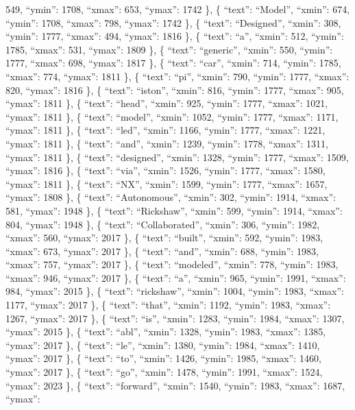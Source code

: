 \documentclass[
]{article}
\begin{document}
549, ``ymin'': 1708, ``xmax'': 653, ``ymax'': 1742 \}, \{ ``text'':
``Model'', ``xmin'': 674, ``ymin'': 1708, ``xmax'': 798, ``ymax'': 1742
\}, \{ ``text'': ``Designed'', ``xmin'': 308, ``ymin'': 1777, ``xmax'':
494, ``ymax'': 1816 \}, \{ ``text'': ``a'', ``xmin'': 512, ``ymin'':
1785, ``xmax'': 531, ``ymax'': 1809 \}, \{ ``text'': ``generic'',
``xmin'': 550, ``ymin'': 1777, ``xmax'': 698, ``ymax'': 1817 \}, \{
``text'': ``car'', ``xmin'': 714, ``ymin'': 1785, ``xmax'': 774,
``ymax'': 1811 \}, \{ ``text'': ``pi'', ``xmin'': 790, ``ymin'': 1777,
``xmax'': 820, ``ymax'': 1816 \}, \{ ``text'': ``iston'', ``xmin'': 816,
``ymin'': 1777, ``xmax'': 905, ``ymax'': 1811 \}, \{ ``text'': ``head'',
``xmin'': 925, ``ymin'': 1777, ``xmax'': 1021, ``ymax'': 1811 \}, \{
``text'': ``model'', ``xmin'': 1052, ``ymin'': 1777, ``xmax'': 1171,
``ymax'': 1811 \}, \{ ``text'': ``led'', ``xmin'': 1166, ``ymin'': 1777,
``xmax'': 1221, ``ymax'': 1811 \}, \{ ``text'': ``and'', ``xmin'': 1239,
``ymin'': 1778, ``xmax'': 1311, ``ymax'': 1811 \}, \{ ``text'':
``designed'', ``xmin'': 1328, ``ymin'': 1777, ``xmax'': 1509, ``ymax'':
1816 \}, \{ ``text'': ``via'', ``xmin'': 1526, ``ymin'': 1777, ``xmax'':
1580, ``ymax'': 1811 \}, \{ ``text'': ``NX'', ``xmin'': 1599, ``ymin'':
1777, ``xmax'': 1657, ``ymax'': 1808 \}, \{ ``text'': ``Autonomous'',
``xmin'': 302, ``ymin'': 1914, ``xmax'': 581, ``ymax'': 1948 \}, \{
``text'': ``Rickshaw'', ``xmin'': 599, ``ymin'': 1914, ``xmax'': 804,
``ymax'': 1948 \}, \{ ``text'': ``Collaborated'', ``xmin'': 306,
``ymin'': 1982, ``xmax'': 560, ``ymax'': 2017 \}, \{ ``text'':
``built'', ``xmin'': 592, ``ymin'': 1983, ``xmax'': 673, ``ymax'': 2017
\}, \{ ``text'': ``and'', ``xmin'': 688, ``ymin'': 1983, ``xmax'': 757,
``ymax'': 2017 \}, \{ ``text'': ``modeled'', ``xmin'': 778, ``ymin'':
1983, ``xmax'': 946, ``ymax'': 2017 \}, \{ ``text'': ``a'', ``xmin'':
965, ``ymin'': 1991, ``xmax'': 984, ``ymax'': 2015 \}, \{ ``text'':
``rickshaw'', ``xmin'': 1004, ``ymin'': 1983, ``xmax'': 1177, ``ymax'':
2017 \}, \{ ``text'': ``that'', ``xmin'': 1192, ``ymin'': 1983,
``xmax'': 1267, ``ymax'': 2017 \}, \{ ``text'': ``is'', ``xmin'': 1283,
``ymin'': 1984, ``xmax'': 1307, ``ymax'': 2015 \}, \{ ``text'': ``abl'',
``xmin'': 1328, ``ymin'': 1983, ``xmax'': 1385, ``ymax'': 2017 \}, \{
``text'': ``le'', ``xmin'': 1380, ``ymin'': 1984, ``xmax'': 1410,
``ymax'': 2017 \}, \{ ``text'': ``to'', ``xmin'': 1426, ``ymin'': 1985,
``xmax'': 1460, ``ymax'': 2017 \}, \{ ``text'': ``go'', ``xmin'': 1478,
``ymin'': 1991, ``xmax'': 1524, ``ymax'': 2023 \}, \{ ``text'':
``forward'', ``xmin'': 1540, ``ymin'': 1983, ``xmax'': 1687, ``ymax'':
\end{document}
